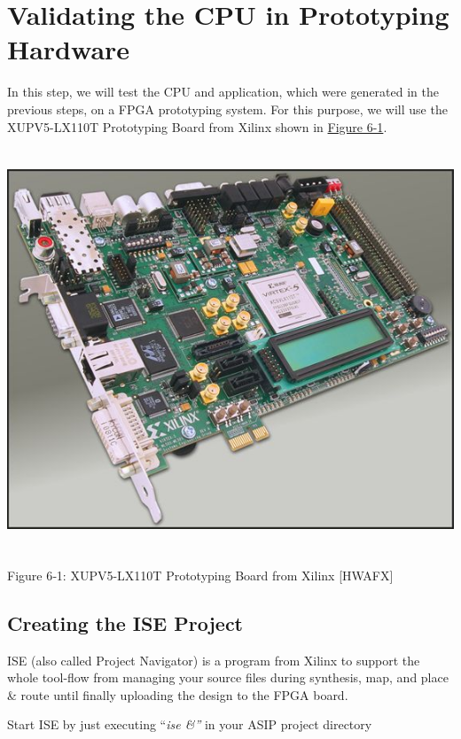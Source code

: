\documentclass[
]{article}
\author{}
\date{}
\begin{document}
\hypertarget{validating-the-cpu-in-prototyping-hardware}{%
\section{Validating the CPU in Prototyping
Hardware}\label{validating-the-cpu-in-prototyping-hardware}}

In this step, we will test the CPU and application, which were generated
in the previous steps, on a FPGA prototyping system. For this purpose,
we will use the XUPV5-LX110T Prototyping Board from Xilinx shown in
\protect\hyperlink{Fig61}{Figure 6-1}.

\includegraphics[width=5.86597in,height=4.73125in]{6-1.png}

Figure 6‑1:\protect\hypertarget{Fig61}{}{} XUPV5-LX110T Prototyping
Board from Xilinx {[}HWAFX{]}

\hypertarget{creating-the-ise-project}{%
\subsection{Creating the ISE Project}\label{creating-the-ise-project}}

ISE (also called Project Navigator) is a program from Xilinx to support
the whole tool-flow from managing your source files during synthesis,
map, and place \& route until finally uploading the design to the FPGA
board.

Start ISE by just executing ``\emph{ise \&''} in your ASIP project
directory
\end{document}
